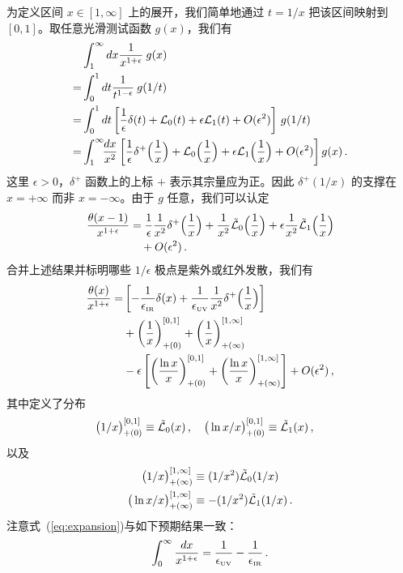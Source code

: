 为定义区间 $x\in [1,\infty]$ 上的展开，我们简单地通过 $t=1/x$ 把该区间映射到 $[0,1]$。取任意光滑测试函数 $g(x)$，我们有
\begin{align}
	&\int_1^\infty dx {1\over x^{1+\epsilon}} \: g(x)
    \\
	=& \int_0^1 dt {1\over t^{1-\epsilon}}  \:  g(1/t)
   \nonumber\\
	=& \int_0^1 dt \left[{1\over\epsilon}\delta(t)+ \mathcal{L}_0(t) + \epsilon \mathcal{L}_1(t)+ O(\epsilon^2)\right] \, g(1/t)
    \nonumber\\
	=& \int_1^\infty\!\! {dx\over x^2}\left[{1\over\epsilon}\delta^+\Bigl({1\over x}\Bigr)+ \mathcal{L}_0\Bigl({1\over x}\Bigr) + \epsilon \mathcal{L}_1\Bigl({1\over x}\Bigr)+ O(\epsilon^2)\right] g(x)
   \,.\nonumber
\end{align}
这里 $\epsilon>0$，$\delta^+$ 函数上的上标 $+$ 表示其宗量应为正。因此 $\delta^+(1/x)$ 的支撑在 $x=+\infty$ 而非 $x=-\infty$。由于 $g$ 任意，我们可以认定
\begin{align}
  {\theta(x-1)\over x^{1+\epsilon}}
   &= {1\over\epsilon}{1\over x^2}\delta^+\Bigl({1\over x}\Bigr)
   + \frac{1}{x^2} \tilde{\mathcal{L}}_0\Bigl({1\over x}\Bigr)
   + \epsilon \frac{1}{x^2} \tilde{\mathcal{L}}_1\Bigl({1\over x}\Bigr)
  \nonumber\\
  &\quad + O(\epsilon^2)\,.
\end{align}
合并上述结果并标明哪些 $1/\epsilon$ 极点是紫外或红外发散，我们有
\begin{align} \label{eq:expansion}
	{\theta(x)\over x^{1+\epsilon}}
 = & \left[-\frac{1}{\epsilon_{\mbox{\tiny IR}}}\delta(x) + \frac{1}{\epsilon_{\mbox{\tiny UV}}} {1\over  x^2}\delta^+\Bigl({1\over x}\Bigr)\right]
    \\
    & + \left({1\over x}\right)^{[0,1]}_{+(0)}+\left({1\over x}\right)^{[1,\infty]}_{+(\infty)}
  \nonumber\\
	& - \epsilon\left[\left({\ln x\over x}\right)^{[0,1]}_{+(0)}+\left({\ln x\over x}\right)^{[1,\infty]}_{+(\infty)}\right] + O(\epsilon^2)
   \,, \nonumber
\end{align}
其中定义了分布
\begin{align}
  \big(1/x\big)_{+(0)}^{[0,1]} &\equiv  \tilde{{\cal L}}_0(x)
  \,,  \quad
  \big(\ln x/x\big)_{+(0)}^{[0,1]} \equiv  \tilde{{\cal L}}_1(x)
  \,,
\end{align}
以及
\begin{align}\label{eq:plusinfinity}
 \big(1/x\big)_{+(\infty)}^{[1,\infty]} &\equiv (1/x^2) \tilde{{\cal L}}_0(1/x)
   \, \\
\big(\ln x/x\big)_{+(\infty)}^{[1,\infty]} &\equiv -(1/x^2) \tilde{{\cal L}}_1(1/x)
   \,. \nonumber
\end{align}
注意式~(\ref{eq:expansion})与如下预期结果一致：
\begin{align}
 \int_0^\infty \frac{dx}{x^{1+\epsilon}}
 = \frac{1}{\epsilon_{\mbox{\tiny UV}} }
  -\frac{1}{\epsilon_{\mbox{\tiny IR}} } \,.
\end{align}


\begingroup
\makeatletter

\makeatother
\endgroup

